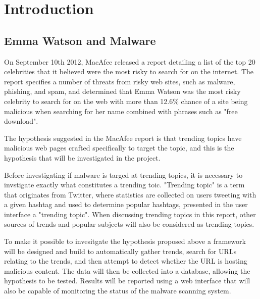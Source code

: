 \section{Introduction}

\subsection{Emma Watson and Malware}
On September 10th 2012, MacAfee released a report detailing a list of the top 20
celebrities that it believed were the most risky to search for on the internet.
The report specifies a number of threats from risky web sites, such as malware,
phishing, and spam, and determined that Emma Watson was the most risky celebrity
to search for on the web with more than 12.6\% chance of a site being malicious
when searching for her name combined with phrases such as "free download".

The hypothesis suggested in the MacAfee report is that trending topics have
malicious web pages crafted specifically to target the topic, and this is the
hypothesis that will be investigated in the project.

Before investigating if malware is targed at trending topics, it is necessary to
invstigate exactly what constitutes a trending toic. "Trending topic" is a term
that originates from Twitter, where statistics are collected on users tweeting
with a given hashtag and used to determine popular hashtags, presented in the
user interface a "trending topic". When discussing trending topics in this
report, other sources of trends and popular subjects will also be considered as
trending topics.

To make it possible to invesitgate the hypothesis proposed above a framework
will be designed and build to automatically gather trends, search for URLs
relating to the trends, and then attempt to detect whether the URL is hosting
malicious content. The data will then be collected into a database, allowing the
hypothesis to be tested. Results will be reported using a web interface that
will also be capable of monitoring the status of the malware scanning system.


